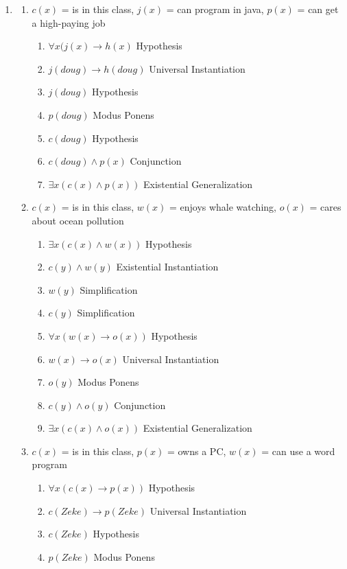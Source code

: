 \documentclass{article}
\begin{document}
\begin{enumerate}
\item
 \begin{enumerate}
 \item $c(x)$ = is in this class, $j(x)$ = can program in java, $p(x)$ = can get a high-paying job
  \begin{enumerate}
  \item $\forall x(j(x) \rightarrow h(x)$ \quad Hypothesis
  \item $j(doug) \rightarrow h(doug)$ \quad  Universal Instantiation
  \item $j(doug)$ \quad Hypothesis
  \item $p(doug)$ \quad Modus Ponens
  \item $c(doug)$ \quad Hypothesis
  \item $c(doug) \land p(x)$ \quad Conjunction
  \item $\exists x (c(x) \land p(x))$ \quad Existential Generalization
  \end{enumerate}
 \item $c(x)$ = is in this class, $w(x)$ = enjoys whale watching, $o(x)$ = cares about ocean pollution
  \begin{enumerate}
  \item $\exists x(c(x) \land w(x))$ \quad Hypothesis
  \item $c(y) \land w(y)$ \quad Existential Instantiation
  \item $w(y)$ \quad Simplification
  \item $c(y)$ \quad Simplification
  \item $\forall x(w(x) \rightarrow o(x))$ \quad Hypothesis
  \item $w(x) \rightarrow o(x)$ \quad Universal Instantiation
  \item $o(y)$ \quad Modus Ponens
  \item $c(y) \land o(y)$ \quad Conjunction
  \item $\exists x(c(x) \land o(x))$ \quad Existential Generalization
  \end{enumerate}
 \item $c(x)$ = is in this class, $p(x)$ = owns a PC, $w(x)$ = can use a word program
  \begin{enumerate}
  \item $\forall x(c(x) \rightarrow p(x))$ \quad Hypothesis
  \item $c(Zeke) \rightarrow p(Zeke)$ \quad Universal Instantiation
  \item $c(Zeke)$ \quad Hypothesis
  \item $p(Zeke)$ \quad Modus Ponens

\end{enumerate}
\end{enumerate}
\end{enumerate}
\end{document}
